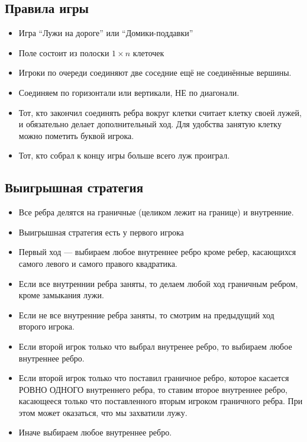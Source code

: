 \documentclass[10pt,russian,]{article}
\providecommand{\tightlist}{%
  \setlength{\itemsep}{0pt}\setlength{\parskip}{0pt}}
\begin{document}
\subsection{Правила игры}\label{-}

\begin{itemize}
\tightlist
\item
  Игра ``Лужи на дороге'' или ``Домики-поддавки''
\item
  Поле состоит из полоски \(1 \times n\) клеточек
\item
  Игроки по очереди соединяют две соседние ещё не соединённые вершины.
\item
  Соединяем по горизонтали или вертикали, НЕ по диагонали.
\item
  Тот, кто закончил соединять ребра вокруг клетки считает клетку своей
  лужей, и обязательно делает дополнительный ход. Для удобства занятую
  клетку можно пометить буквой игрока.
\item
  Тот, кто собрал к концу игры больше всего луж проиграл.
\end{itemize}

\newpage

\subsection{Выигрышная стратегия}\label{-}

\begin{itemize}
\item
  Все ребра делятся на граничные (целиком лежит на границе) и
  внутренние.
\item
  Выигрышная стратегия есть у первого игрока
\item
  Первый ход --- выбираем любое внутреннее ребро кроме ребер, касающихся
  самого левого и самого правого квадратика.
\item
  Если все внутреннии ребра заняты, то делаем любой ход граничным
  ребром, кроме замыкания лужи.
\item
  Если не все внутренние ребра заняты, то смотрим на предыдущий ход
  второго игрока.
\item
  Если второй игрок только что выбрал внутренее ребро, то выбираем любое
  внутреннее ребро.
\item
  Если второй игрок только что поставил граничное ребро, которое
  касается РОВНО ОДНОГО внутреннего ребра, то ставим второе внутреннее
  ребро, касающееся только что поставленного вторым игроком граничного
  ребра. При этом может оказаться, что мы захватили лужу.
\item
  Иначе выбираем любое внутреннее ребро.
\end{itemize}
\end{document}
